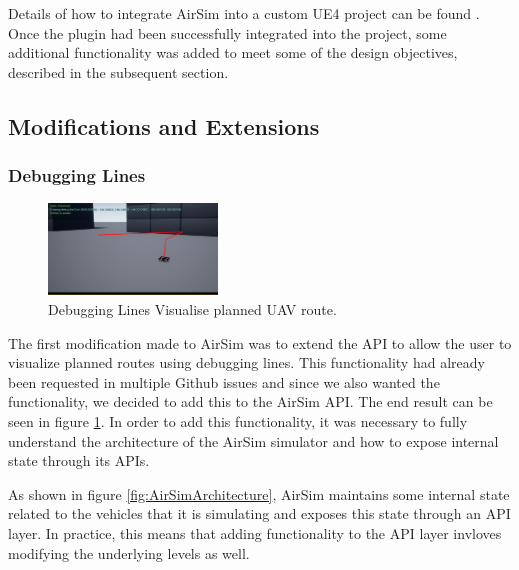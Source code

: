 Details of how to integrate AirSim into a custom UE4 project can be found %
. Once the plugin had been successfully integrated into the project, some additional functionality was added to meet some of the design objectives, described in the subsequent section.

\subsection{Modifications and Extensions}

\subsubsection{Debugging Lines}
\begin{figure}
    \centering
    \includegraphics[width=0.4\textwidth]{Chapters/SimulationEnv/Figs/DebuggingLines/DebugLines.png}
    \caption{Debugging Lines Visualise planned UAV route.}
    \label{fig:DebuggingLines}
\end{figure}
The first modification made to AirSim was to extend the API to allow the user to visualize planned routes using debugging lines. This functionality had already been requested in multiple Github issues  and since we also wanted the functionality, we decided to add this to the AirSim API. The end result can be seen in figure \ref{fig:DebuggingLines}. In order to add this functionality, it was necessary to fully understand the architecture of the AirSim simulator and how to expose internal state through its APIs.

As shown in figure \ref{fig:AirSimArchitecture}, AirSim maintains some internal state related to the vehicles that it is simulating and exposes this state through an API layer. In practice, this means that adding functionality to the API layer invloves modifying the underlying levels as well.


